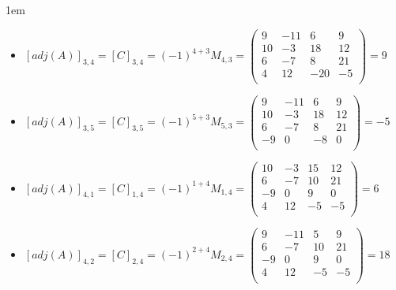 \documentclass[12pt, fleqn]{article}                             %
\newenvironment{SmallIndentation}[1][0.75em]                    %
        {\begin{adjustwidth}{#1}{}\begin{footnotesize}}             %
        {\end{footnotesize}\end{adjustwidth}}                       %
\theoremstyle{break}                                            %
\newcommand{\pVector}[1]                                        %
        { \ensuremath{\begin{pmatrix}#1\end{pmatrix}} }             %
\begin{document}
\begin{itemize}
\begin{SmallIndentation}[1em]
\begin{itemize}
                    \item
                        $[adj(A)]_{3, 4} 
                            = [C]_{3, 4} 
                            = (-1)^{4+3} M_{4, 3}
                            = \pVector{
                                    9  & -11 & 6   & 9    \\
                                    10 & -3  & 18  & 12   \\
                                    6  & -7  & 8   & 21   \\
                                    4  & 12  & -20 & -5   \\
                                }
                            = 9$

                    \item
                        $[adj(A)]_{3, 5} 
                            = [C]_{3, 5} 
                            = (-1)^{5+3} M_{5, 3}
                            = \pVector{
                                    9  & -11 & 6   & 9    \\
                                    10 & -3  & 18  & 12   \\
                                    6  & -7  & 8   & 21   \\
                                    -9 & 0   & -8  & 0    \\
                                }
                            = -5$

                    \item
                        $[adj(A)]_{4, 1} 
                            = [C]_{1, 4} 
                            = (-1)^{1+4} M_{1, 4}
                            = \pVector{
                                    10 & -3  & 15 & 12   \\
                                    6  & -7  & 10 & 21   \\
                                    -9 & 0   & 9  & 0    \\
                                    4  & 12  & -5 & -5   \\
                                }
                            = 6$

                    \item
                        $[adj(A)]_{4, 2} 
                            = [C]_{2, 4} 
                            = (-1)^{2+4} M_{2, 4}
                            = \pVector{
                                    9  & -11 & 5  & 9    \\
                                    6  & -7  & 10 & 21   \\
                                    -9 & 0   & 9  & 0    \\
                                    4  & 12  & -5 & -5   \\
                                }
                            = 18$


\end{itemize}
\end{SmallIndentation}
\end{itemize}
\end{document}
